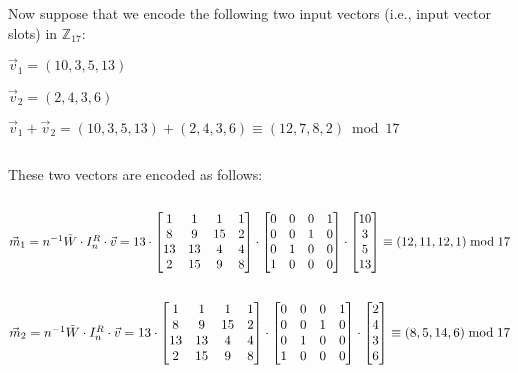 $ $

Now suppose that we encode the following two input vectors (i.e., input vector slots) in $\mathbb{Z}_{17}$:

$\vec{v}_1 = (10, 3, 5, 13)$

$\vec{v}_2 = (2, 4, 3, 6)$

$\vec{v}_1 + \vec{v}_2 = (10, 3, 5, 13) + (2, 4, 3, 6) \equiv (12, 7, 8, 2) \bmod 17$

$ $

These two vectors are encoded as follows:

$ $

$\vec{m}_1 = n^{-1} \tilde{W} \cdot I_n^R \cdot \vec{v} = 13 \cdot \begin{bmatrix}
1 & 1 & 1 & 1\\
8 & 9 & 15 & 2\\
13 & 13 & 4 & 4\\
2 & 15 & 9 & 8\\
\end{bmatrix} \cdot \begin{bmatrix}
0 & 0 & 0 & 1\\
0 & 0 & 1 & 0\\
0 & 1 & 0 & 0\\
1 & 0 & 0 & 0\\
\end{bmatrix} \cdot \begin{bmatrix}
10\\
3\\
5\\
13\\
\end{bmatrix} \equiv (12, 11, 12,1)  \bmod 17$

$ $

$\vec{m}_2 = n^{-1} \tilde{W} \cdot I_n^R \cdot \vec{v} = 13 \cdot \begin{bmatrix}
1 & 1 & 1 & 1\\
8 & 9 & 15 & 2\\
13 & 13 & 4 & 4\\
2 & 15 & 9 & 8\\
\end{bmatrix} \cdot \begin{bmatrix}
0 & 0 & 0 & 1\\
0 & 0 & 1 & 0\\
0 & 1 & 0 & 0\\
1 & 0 & 0 & 0\\
\end{bmatrix} \cdot \begin{bmatrix}
2\\
4\\
3\\
6\\
\end{bmatrix} \equiv (8, 5, 14, 6) \bmod 17$

